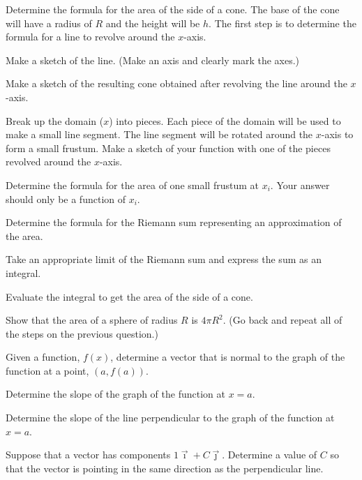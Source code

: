 \begin{problem}
  \item Determine the formula for the area of the side of a cone.
      The base of the cone will have a radius of $R$ and the height will be $h$.
      The first step is to determine the formula for a line to revolve around the $x$-axis.
  \begin{subproblem}
    \item Make a sketch of the line. (Make an axis and clearly mark the
      axes.)
      \vfill

    \item Make a sketch of the resulting cone obtained after
      revolving the line around the $x$-axis.
      \vfill

    \item Break up the domain ($x$) into pieces. Each piece of the domain will be used to make a small line segment.
         The line segment will be rotated around the $x$-axis to form a small frustum.
         Make a sketch of your function with one of the pieces revolved around the $x$-axis.
      \vfill

    \clearpage

    \item Determine the formula for the area of one small frustum at $x_i$. Your answer should only be a function of $x_i$.
      \vfill

    \item Determine the formula for the Riemann sum representing an approximation of the area.
      \vfill

    \item Take an appropriate limit of the Riemann sum and express the sum as an integral.
      \vfill

    \item Evaluate the integral to get the area of the side of a cone.
      \vfill

  \end{subproblem}

  \clearpage

  \item  Show that the area of a sphere of radius $R$ is $4\pi R^2$.
    (Go back and repeat all of the steps on the previous question.)

    \clearpage

    \item Given a function, $f(x)$, determine a vector that is normal to the graph of the function at a point, $(a,f(a))$.
    \begin{subproblem}
      \item  Determine the slope of the graph of the function at $x=a$.
        \vfill
      \item Determine the slope of the line perpendicular to the graph of the function at $x=a$.
        \vfill
      \item Suppose that a vector has components $1 \vec{\imath} + C \vec{\jmath}$. Determine a value of $C$ so that the vector is pointing in the same direction as the perpendicular line.
        \vfill
    \end{subproblem}

\end{problem}

